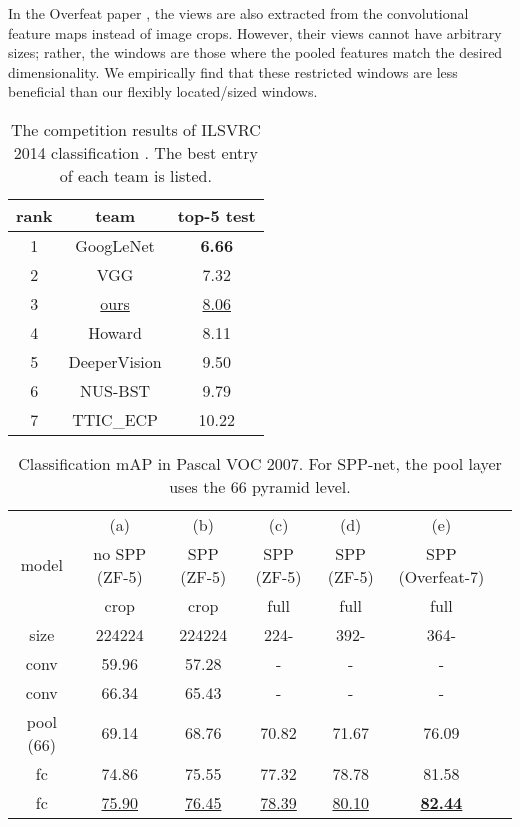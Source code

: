 \documentclass[10pt,journal,cspaper,compsoc]{IEEEtran}
\begin{document}
In the Overfeat paper \cite{Sermanet2013}, the views are also extracted from the convolutional feature maps instead of image crops. However, their views cannot have arbitrary sizes; rather, the windows are those where the pooled features match the desired dimensionality. We empirically find that these restricted windows are less beneficial than our flexibly located/sized windows.

\setlength{\tabcolsep}{8pt}
\begin{table}[t]
\small
\begin{center}
\begin{tabular}{cc|c}
\hline
rank & team & top-5 test\\
\hline
1 &  GoogLeNet \cite{Szegedy2014} & \textbf{6.66}\\
2 & VGG \cite{Simonyan2014} & 7.32\\
3 & \underline{ours} & \underline{8.06}\\
4 & Howard & 8.11\\
5 & DeeperVision & 9.50\\
6 & NUS-BST & 9.79\\
7 & TTIC\_ECP & 10.22\\
\hline
\end{tabular}
\caption{The competition results of ILSVRC 2014 classification \cite{Russakovsky2014}. The best entry of each team is listed.}
\label{tab:ilsvrc14_CLS}
\end{center}
\end{table}

\setlength{\tabcolsep}{4pt}
\begin{table*}[t]
\footnotesize
\begin{center}
\begin{tabular}{c|cccccc}
\hline
      & (a)       & (b) & (c) & (d) & (e)\\
model & no SPP (ZF-5) & SPP (ZF-5) & SPP (ZF-5) & SPP (ZF-5) & SPP (Overfeat-7)\\
\hline
     &                    crop     &    crop    &  full & full & full\\
size &                224224 & 224224 & 224- & 392- & 364- \\
\hline
conv &                59.96 & 57.28 & -  & - & - \\
conv &                66.34 & 65.43 & -  & - & - \\
pool (66) &   69.14 & 68.76 & 70.82 & 71.67 & 76.09 \\
fc &                  74.86 & 75.55 & 77.32 & 78.78 & 81.58 \\
fc &                  \underline{75.90} & \underline{76.45} & \underline{78.39} & \underline{80.10} & \underline{\textbf{82.44}} \\
\hline
\end{tabular}
\end{center}
\caption{Classification mAP in Pascal VOC 2007. For SPP-net, the pool layer uses the 66 pyramid level.}
\label{tab:voc2007}
\end{table*}
\end{document}
